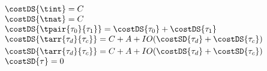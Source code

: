 \begin{flushleft}
$\begin{array}{l}
  \costDS{\tint} = C
\\
  \costDS{\tnat} = C
\\
  \costDS{\tpair{\tau_0}{\tau_1}} = \costDS{\tau_0} + \costDS{\tau_1}
\\
  \costDS{\tarr{\tau_d}{\tau_c}} = C + A + IO(\costSD{\tau_d} + \costDS{\tau_c})
\\[0.6ex]
  \costSD{\tarr{\tau_d}{\tau_c}} = C + A + IO(\costDS{\tau_d} + \costSD{\tau_c})
\\
  \costSD{\tau} = 0
\end{array}$
\end{flushleft}
